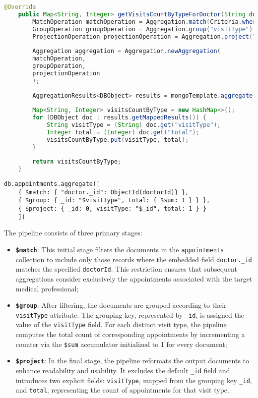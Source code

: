 \begin{lstlisting}[language=java]
	@Override
	public Map<String, Integer> getVisitsCountByTypeForDoctor(String doctorId){
		MatchOperation matchOperation = Aggregation.match(Criteria.where("doctor.id").is(doctorId));
		GroupOperation groupOperation = Aggregation.group("visitType").count().as("total");
		ProjectionOperation projectionOperation = Aggregation.project("total").and("visitType").previousOperation();
		
		Aggregation aggregation = Aggregation.newAggregation(
		matchOperation,
		groupOperation,
		projectionOperation
		);
		
		AggregationResults<DBObject> results = mongoTemplate.aggregate(aggregation, Appointment.class, DBObject.class);
		
		Map<String, Integer> visitsCountByType = new HashMap<>();
		for (DBObject doc : results.getMappedResults()) {
			String visitType = (String) doc.get("visitType");
			Integer total = (Integer) doc.get("total");
			visitsCountByType.put(visitType, total);
		}
		
		return visitsCountByType;
	}
\end{lstlisting}

\begin{lstlisting}[language=mongodb]
	db.appointments.aggregate([
	{ $match: { "doctor._id": ObjectId(doctorId)} },
	{ $group: { _id: "$visitType", total: { $sum: 1 } } },
	{ $project: { _id: 0, visitType: "$_id", total: 1 } }
	])
\end{lstlisting}


The pipeline consists of three primary stages:
\begin{itemize}
	\item \textbf{\texttt{\$match}}: This initial stage filters the documents in the \texttt{appointments} collection to include only those records where the embedded field \texttt{doctor.\_id} matches the specified \texttt{doctorId}. This restriction ensures that subsequent aggregations consider exclusively the appointments associated with the target medical professional;
	
	\item \textbf{\texttt{\$group}}: After filtering, the documents are grouped according to their \texttt{visitType} attribute. The grouping key, represented by \texttt{\_id}, is assigned the value of the \texttt{visitType} field. For each distinct visit type, the pipeline computes the total count of corresponding appointments by incrementing a counter via the \texttt{\$sum} accumulator initialized to 1 for every document;
	
	\item \textbf{\texttt{\$project}}: In the final stage, the pipeline reformats the output documents to enhance readability and usability. It excludes the default \texttt{\_id} field and introduces two explicit fields: \texttt{visitType}, mapped from the grouping key \texttt{\_id}, and \texttt{total}, representing the count of appointments for that visit type.
	
\end{itemize}

